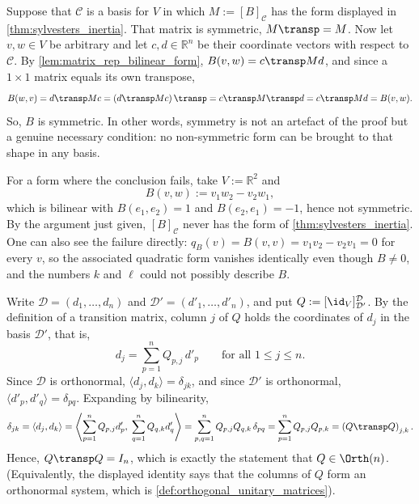 \begin{exercisesolution}
\label{sol:sylvester_needs_symmetry}
Suppose that $\mathcal{C}$ is a basis for $V$ in which $M := [B]_{\mathcal{C}}$ has the form displayed in \cref{thm:sylvesters_inertia}. That matrix is symmetric, $M\transp = M$. Now let $v, w \in V$ be arbitrary and let $c, d \in \mathbb{R}^n$ be their coordinate vectors with respect to $\mathcal{C}$. By \cref{lem:matrix_rep_bilinear_form}, $B(v, w) = c\transp M d$, and since a $1 \times 1$ matrix equals its own transpose,
\[
    B(w, v) = d\transp M c = \left(d\transp M c\right)\transp = c\transp M\transp d = c\transp M d = B(v, w).
\]
So, $B$ is symmetric. In other words, symmetry is not an artefact of the proof but a genuine necessary condition: no non-symmetric form can be brought to that shape in any basis.

For a form where the conclusion fails, take $V := \mathbb{R}^2$ and
\[ B(v, w) := v_1 w_2 - v_2 w_1, \]
which is bilinear with $B(e_1, e_2) = 1$ and $B(e_2, e_1) = -1$, hence not symmetric. By the argument just given, $[B]_{\mathcal{C}}$ never has the form of \cref{thm:sylvesters_inertia}. One can also see the failure directly: $q_B(v) = B(v, v) = v_1 v_2 - v_2 v_1 = 0$ for every $v$, so the associated quadratic form vanishes identically even though $B \neq 0$, and the numbers $k$ and $\ell$ could not possibly describe $B$.
\end{exercisesolution}

\begin{exercisesolution}
\label{sol:transition_between_orthonormal_bases}
Write $\mathcal{D} = (d_1, \dots, d_n)$ and $\mathcal{D}' = (d'_1, \dots, d'_n)$, and put $Q := [\id_V]_{\mathcal{D}'}^{\mathcal{D}}$. By the definition of a transition matrix, column $j$ of $Q$ holds the coordinates of $d_j$ in the basis $\mathcal{D}'$, that is,
\[ d_j = \sum_{p=1}^n Q_{p,j} \, d'_p \qquad \text{for all } 1 \le j \le n. \]
Since $\mathcal{D}$ is orthonormal, $\langle d_j, d_k \rangle = \delta_{jk}$, and since $\mathcal{D}'$ is orthonormal, $\langle d'_p, d'_q \rangle = \delta_{pq}$. Expanding by bilinearity,
\[
    \delta_{jk} = \langle d_j, d_k \rangle = \left\langle \sum_{p=1}^n Q_{p,j} d'_p, \; \sum_{q=1}^n Q_{q,k} d'_q \right\rangle = \sum_{p,q=1}^n Q_{p,j} Q_{q,k} \, \delta_{pq} = \sum_{p=1}^n Q_{p,j} Q_{p,k} = \left(Q\transp Q\right)_{j,k}.
\]
Hence, $Q\transp Q = I_n$, which is exactly the statement that $Q \in \Orth(n)$. (Equivalently, the displayed identity says that the columns of $Q$ form an orthonormal system, which is \cref{def:orthogonal_unitary_matrices}).
\end{exercisesolution}

